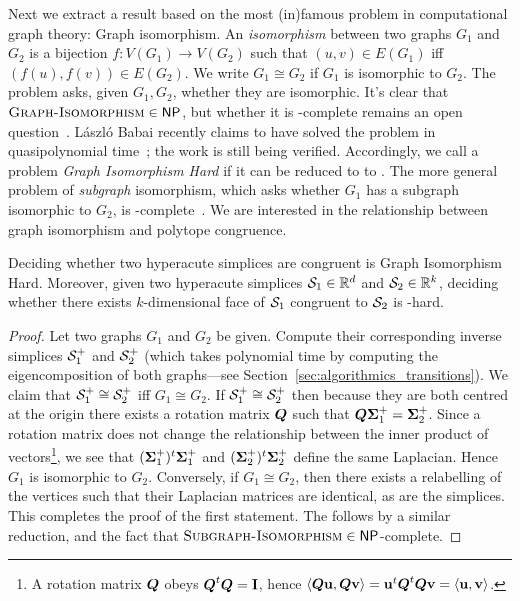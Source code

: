Next we extract a result based on the most (in)famous problem in computational graph theory: Graph isomorphism. An \emph{isomorphism} between two graphs $G_1$ and $G_2$ is a bijection $f:V(G_1)\to V(G_2)$ such that $(u,v)\in E(G_1)$ iff $(f(u),f(v))\in E(G_2)$. We write $G_1\cong G_2$ if $G_1$ is isomorphic to $G_2$. The \graphiso problem asks, given $G_1,G_2$, whether they are isomorphic. 
It's clear that $\textsc{Graph-Isomorphism}\in{\normalfont\textsf{NP}}$, but whether it is \NP-complete remains an open question~\cite{mckay2014practical}. L{\'a}szl{\'o} Babai recently claims to have solved the problem in  quasipolynomial time~\cite{babai2016graph}; the work is still being verified. 
Accordingly, we call a problem \emph{Graph Isomorphism Hard} if it can be reduced to to \graphiso. 
The more general problem of \emph{subgraph} isomorphism, which asks whether $G_1$ has a subgraph isomorphic to $G_2$, is \NP-complete~\cite{cook1971complexity, karp1972reducibility}. We are interested in the relationship between graph isomorphism and polytope congruence.  

\begin{theorem}
	\label{thm:simplex_congruence}
Deciding whether two hyperacute simplices are congruent is Graph Isomorphism Hard. Moreover, given two hyperacute simplices $\mathcal{S}_1\in\mathbb{R}^d$ and $\mathcal{S}_2\in\mathbb{R}^k$, deciding whether there exists $k$-dimensional face of $\mathcal{S}_1$ congruent to $\mathcal{S}_2$ is \NP-hard. 
\end{theorem}
\begin{proof}
	Let two graphs $G_1$ and $G_2$ be given. Compute their corresponding inverse simplices $\mathcal{S}_1^+$ and $\mathcal{S}_2^+$ (which  takes polynomial time  by  computing  the eigencomposition of both graphs---see Section~\ref{sec:algorithmics_transitions}). 
	We claim that $\mathcal{S}_1^+\cong\mathcal{S}_2^+$ iff $G_1\cong G_2$. If $\mathcal{S}_1^+\cong\mathcal{S}_2^+$ then because they are both centred at the origin there exists a rotation matrix $\vb*{Q}$ such that $\vb*{Q}\boldsymbol{\Sigma}_1^+=\boldsymbol{\Sigma}_2^+$. Since a rotation matrix does not change the relationship between the inner product of vectors\footnote{A rotation matrix $\vb*{Q}$ obeys $\vb*{Q}^t\vb*{Q}=\vb{I}$, hence $\langle \vb*{Q}\vb{u},\vb*{Q}\vb{v}\rangle = \vb{u}^t \vb*{Q}^t \vb*{Q}\vb{v}=\langle \vb{u},\vb{v}\rangle$.}, we see that $(\boldsymbol{\Sigma}_1^+)^t\boldsymbol{\Sigma}_1^+$ and $(\boldsymbol{\Sigma}_2^+)^t\boldsymbol{\Sigma}_2^+$ define the same Laplacian. Hence $G_1$ is isomorphic to $G_2$. Conversely, if $G_1\cong G_2$, then there exists a  relabelling of the vertices such that their Laplacian matrices are identical, as are the simplices. This completes  the proof of the first statement. The  follows by a similar reduction, and the fact that $\textsc{Subgraph-Isomorphism}\in{\normalfont\textsf{NP}}$-complete.
\end{proof}


